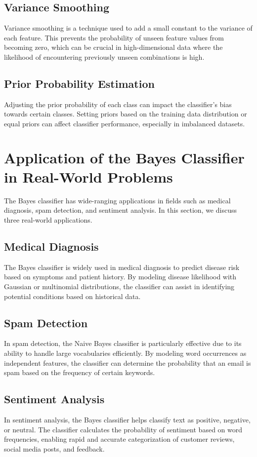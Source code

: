 \documentclass[conference]{IEEEtran}
\begin{document}
	\subsection{Variance Smoothing}
	Variance smoothing is a technique used to add a small constant to the variance of each feature. This prevents the probability of unseen feature values from becoming zero, which can be crucial in high-dimensional data where the likelihood of encountering previously unseen combinations is high.
	
	\subsection{Prior Probability Estimation}
	Adjusting the prior probability of each class can impact the classifier's bias towards certain classes. Setting priors based on the training data distribution or equal priors can affect classifier performance, especially in imbalanced datasets.
	
	\section{Application of the Bayes Classifier in Real-World Problems}
	The Bayes classifier has wide-ranging applications in fields such as medical diagnosis, spam detection, and sentiment analysis. In this section, we discuss three real-world applications.
	
	\subsection{Medical Diagnosis}
	The Bayes classifier is widely used in medical diagnosis to predict disease risk based on symptoms and patient history. By modeling disease likelihood with Gaussian or multinomial distributions, the classifier can assist in identifying potential conditions based on historical data.
	
	\subsection{Spam Detection}
	In spam detection, the Naive Bayes classifier is particularly effective due to its ability to handle large vocabularies efficiently. By modeling word occurrences as independent features, the classifier can determine the probability that an email is spam based on the frequency of certain keywords.
	
	\subsection{Sentiment Analysis}
	In sentiment analysis, the Bayes classifier helps classify text as positive, negative, or neutral. The classifier calculates the probability of sentiment based on word frequencies, enabling rapid and accurate categorization of customer reviews, social media posts, and feedback.
	
\end{document}
